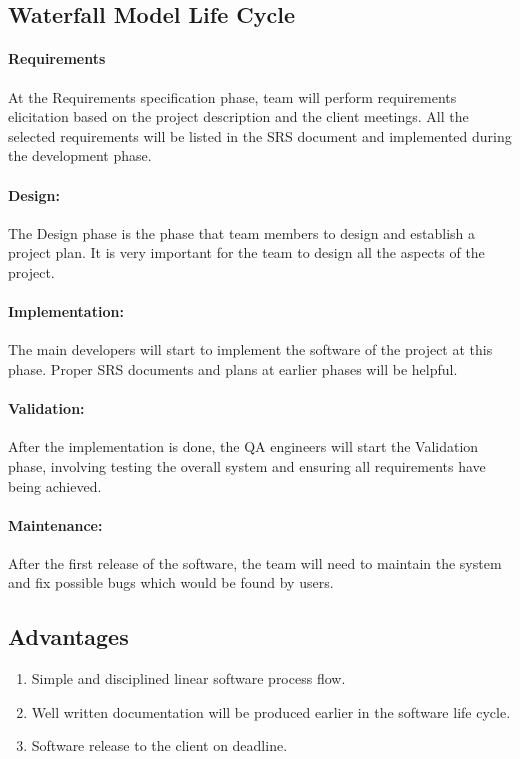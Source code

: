 \documentclass[11pt, a4paper]{report}
\begin{document}
\subsection{Waterfall Model Life Cycle}
\paragraph{Requirements}
At the Requirements specification phase, team will perform requirements elicitation based on the project description and the client meetings. All the selected requirements will be listed in the SRS document and implemented during the development phase.

\paragraph{Design:}
The Design phase is the phase that team members to design and establish a project plan. It is very important for the team to design all the aspects of the project.

\paragraph{Implementation:}
The main developers will start to implement the software of the project at this phase. Proper SRS documents and plans at earlier phases will be helpful. 

\paragraph{Validation:}
After the implementation is done, the QA engineers will start the Validation phase, involving testing the overall system and ensuring all requirements have being achieved. 

\paragraph{Maintenance:}
After the first release of the software, the team will need to maintain the system and fix possible bugs which would be found by users.

\subsection{Advantages}
\begin{enumerate}
	\item  Simple and disciplined linear software process flow.
	\item  Well written documentation will be produced earlier in the software life cycle.
	\item  Software release to the client on deadline.
\end{enumerate}
\end{document}
